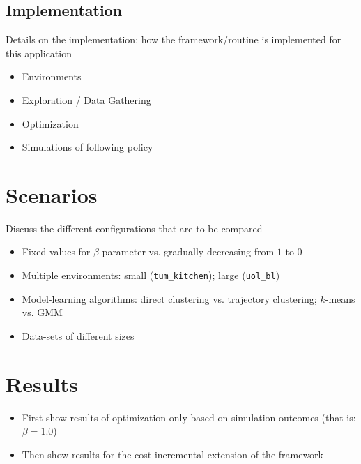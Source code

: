 \subsection{Implementation}
\label{sec:implementation}

Details on the implementation; how the framework/routine is implemented for this application
\begin{itemize}
	\item Environments
	\item Exploration / Data Gathering
	\item Optimization
	\item Simulations of following policy
\end{itemize}

\section{Scenarios}
\label{sec:scenarios}

Discuss the different configurations that are to be compared
\begin{itemize}
	\item Fixed values for $\beta$-parameter vs. gradually decreasing from $1$ to $0$
	\item Multiple environments: small (\texttt{tum\_kitchen}); large (\texttt{uol\_bl})
	\item Model-learning algorithms: direct clustering vs. trajectory clustering; $k$-means vs. GMM
	\item Data-sets of different sizes
\end{itemize}

\vspace{12pt}
\noindent{}

\section{Results}
\label{sec:results}

\begin{itemize}
	\item First show results of optimization only based on simulation outcomes (that is: $\beta = 1.0$)
	\item Then show results for the cost-incremental extension of the framework
\end{itemize}


